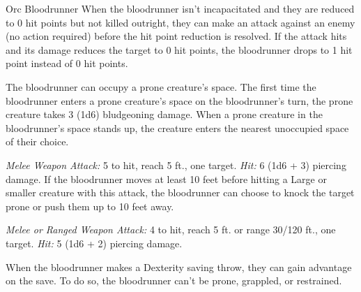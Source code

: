 \documentclass[10pt,a4paper,twoside,bg=print,twocolumn,openany,nodeprecatedcode]{dndbook}
\begin{document}
\begin{DndMonster}[float=t]{Orc Bloodrunner}
\DndMonsterBasics[
armor-class = {15 (shield)},
hit-points = {\DndDice{2d8 + 6}},
speed = {60 ft.}
]
\DndMonsterAbilityScores[
 str = 14,
 dex = 16,
 con = 16,
 int = 11,
 wis = 9,
 cha = 10
]
\DndMonsterDetails[
saving-throws = {Dex +5},
skills = {Acrobatics +5, Athletics +4},
senses = {darkvision 60 ft., passive perception 9},
languages = {Common, Orc},
challenge = 1/2,
]
When the bloodrunner isn't incapacitated and they are reduced to 0 hit points but not killed outright, they can make an attack against an enemy (no action required) before the hit point reduction is resolved. If the attack hits and its damage reduces the target to 0 hit points, the bloodrunner drops to 1 hit point instead of 0 hit points.

The bloodrunner can occupy a prone creature's space. The first time the bloodrunner enters a prone creature's space on the bloodrunner's turn, the prone creature takes 3 (1d6) bludgeoning damage. When a prone creature in the bloodrunner's space stands up, the creature enters the nearest unoccupied space of their choice.

\textsl{Melee Weapon Attack:} 5 to hit, reach 5 ft., one target. \textsl{Hit:} 6 (1d6 + 3) piercing damage. If the bloodrunner moves at least 10 feet before hitting a Large or smaller creature with this attack, the bloodrunner can choose to knock the target prone or push them up to 10 feet away.

\textsl{Melee or Ranged Weapon Attack:} 4 to hit, reach 5 ft. or range 30/120 ft., one target. \textsl{Hit:} 5 (1d6 + 2) piercing damage.

When the bloodrunner makes a Dexterity saving throw, they can gain advantage on the save. To do so, the bloodrunner can't be prone, grappled, or restrained.

\end{DndMonster}
\end{document}
